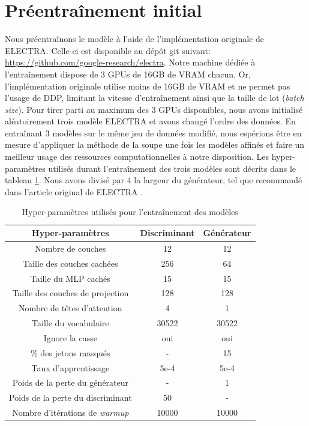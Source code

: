 \documentclass[12pt,twoside,maitrise]{dms}
\theoremstyle{definition}
\numberwithin{equation}{section}
\numberwithin{table}{chapter}
\numberwithin{figure}{chapter}
\begin{document}
\section{Préentraînement initial}
Nous préentraînons le modèle à l'aide de l'implémentation originale de ELECTRA.
Celle-ci est disponible au dépôt git suivant:
\url{https://github.com/google-research/electra}. Notre machine dédiée à
l'entraînement dispose de 3 GPUs de 16GB de VRAM chacun. Or, l'implémentation
originale utilise moins de 16GB de VRAM et ne permet pas l'usage de DDP,
limitant la vitesse d'entraînement ainsi que la taille de lot (\textit{batch
size}). Pour tirer parti au maximum des 3 GPUs disponibles, nous avons
initialisé aléatoirement trois modèle ELECTRA et avons changé l'ordre des
données. En entraînant 3 modèles sur le même jeu de données modifié, nous
espérions être en mesure d'appliquer la méthode de la soupe \cite{soup} une
fois les modèles affinés et faire un meilleur usage des ressources
computationnelles à notre disposition. Les hyper-paramètres utilisés durant
l'entraînement des trois modèles sont décrits dans le tableau \ref{table:hp}.
Nous avons divisé par 4 la largeur du générateur, tel que recommandé dans
l'article original de ELECTRA \cite{clark2020electrapretrainingtextencoders}.


\begin{table}[h!]
\centering
\begin{tabular}{||c | c c||}
 \hline
 Hyper-paramètres & Discriminant & Générateur \\ [0.5ex]
 \hline\hline
 Nombre de couches  & 12 & 12 \\
 Taille des couches cachées & 256 & 64 \\
 Taille du MLP cachés & 15 & 15 \\
 Taille des couches de projection & 128 & 128 \\
 Nombre de têtes d'attention & 4 & 1 \\
 Taille du vocabulaire & 30522 & 30522 \\
 Ignore la casse & oui & oui \\
 \% des jetons masqués & - & 15 \\
 Taux d'apprentissage & 5e-4 & 5e-4 \\
 Poids de la perte du générateur & - & 1 \\
 Poids de la perte du discriminant & 50 & - \\
 Nombre d'itérations de \textit{warmup} & 10000 & 10000\\
 \hline
\end{tabular}
\caption{Hyper-paramètres utilisés pour l'entraînement des modèles}
\label{table:hp}
\end{table}
\end{document}
